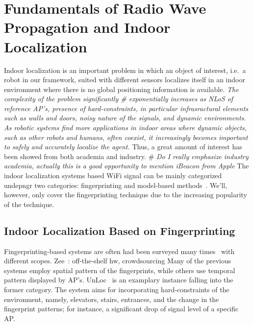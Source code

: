 \section{\label{sec-FU}Fundamentals of Radio Wave Propagation and Indoor Localization}
  Indoor localization is an important problem in which an object of interest, i.e.\ a robot in our framework, suited with different sensors localizes itself in an indoor environment where there is no global positioning information is available.
  \textit{The complexity of the problem significantly \# \textit{exponentially} increases as NLoS of reference AP's, presence of hard-constraints, in particular infrasractural elements such as walls and doors, noisy nature of the signals, and dynamic environments.}~\cite{liu2007survey}
  \textit{As robotic systems find more applications in indoor areas where dynamic objects, such as other robots and humans, often coexist, it increasingly becomes important to safely and accurately localize the agent.} %
  Thus, a great amount of interest has been showed from both academia and industry.
  \# \textit{Do I really emphasize industry academia, actually this is a good opportunity to mention iBeacon from Apple}
  The indoor localization systems based WiFi signal can be mainly categorized undepngr two categories: fingerprinting and model-based methods~\cite{hossain2015survey}.
  We'll, however, only cover the fingerprinting technique due to the increasing popularity of the technique.

  \subsection{Indoor Localization Based on Fingerprinting}
    Fingerprinting-based systems are often   had been surveyed many times~\cite{he2016wi} with different scopes.
    Zee~\cite{rai2012zee}: off-the-shelf hw, crowdsourcing
    Many of the previous systems employ spatial pattern of the fingerprints, while others use temporal pattern displayed by AP's.
    UnLoc~\cite{wang2012no} is an examplary instance falling into the former category.
    The system aims for incorporating hard-constraints of the environment, namely, elevators, stairs, entrances, and the change in the fingerprint patterns; for instance, a significant drop of signal level of a specific AP\@.

